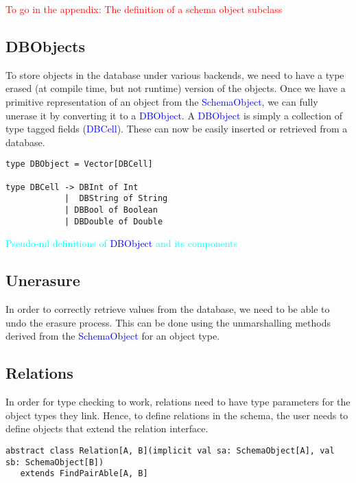 \documentclass[12pt,a4paper,twoside,openright]{report}
\newcommand\todo[1]{\textcolor{red}{#1}}
\newcommand\codeName[1]{\textcolor{blue}{#1}}
\newcommand\note[1]{\textcolor{cyan}{#1}}
\begin{document}
{{	\todo{To go in the appendix: The definition of a schema object subclass}
	
	\subsection{DBObjects}
	
	To store objects in the database under various backends, we need to have a type erased (at compile time, but not runtime) version of the objects. Once we have a primitive representation of an object from the \codeName{SchemaObject}, we can fully unerase it by converting it to a \codeName{DBObject}. A \codeName{DBObject} is simply a collection of type tagged fields (\codeName{DBCell}). These can now be easily inserted or retrieved from a database.
\begin{framed}
	\begin{verbatim}
type DBObject = Vector[DBCell]

type DBCell -> DBInt of Int 
			|  DBString of String
			| DBBool of Boolean
			| DBDouble of Double
	\end{verbatim}
	
	\note{Pseudo-ml definitions of \codeName{DBObject} and its components}
\end{framed}
	
	\subsection{Unerasure}
	In order to correctly retrieve values from the database, we need to be able to undo the erasure process. This can be done using the unmarshalling methods derived from the \codeName{SchemaObject}  for an object type.
	\subsection{Relations}
	    In order for type checking to work, relations need to have type parameters for the object types they link. Hence, to define relations in the schema, the user needs to define objects that extend the relation interface.
	    
\begin{framed}
\begin{verbatim}
abstract class Relation[A, B](implicit val sa: SchemaObject[A], val sb: SchemaObject[B])
   extends FindPairAble[A, B]
\end{verbatim}
\end{framed}



}}
\end{document}
